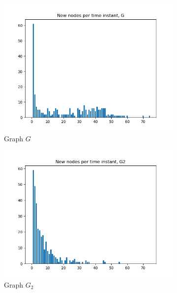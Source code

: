 \documentclass[letterpaper]{article}
\begin{document}
\begin{figure}
    \centering
    \begin{subfigure}[b]{0.32\textwidth}
        \includegraphics[width=\textwidth]{img/newNodesG.png}
        \caption{Graph \(G\)}
	    \label{fig:degree_distribution_G}
    \end{subfigure}
    \begin{subfigure}[b]{0.32\textwidth}
        \includegraphics[width=\textwidth]{img/newNodesG2.png}
        \caption{Graph \(G_2\)}
	    \label{fig:degree_distribution_G2}
    \end{subfigure}
    \begin{subfigure}[b]{0.32\textwidth}

\end{subfigure}
\end{figure}
\end{document}
